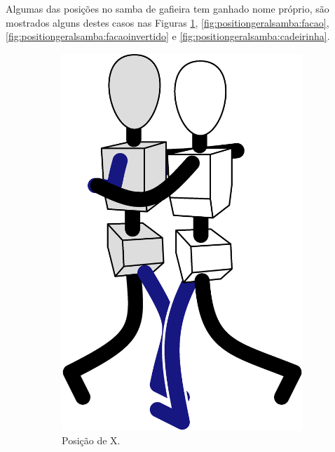 Algumas das posições no samba de gafieira tem ganhado nome próprio, 
são mostrados alguns destes casos nas
Figuras \ref{fig:positiongeralsamba:x}, \ref{fig:positiongeralsamba:facao}, 
\ref{fig:positiongeralsamba:facaoinvertido} e \ref{fig:positiongeralsamba:cadeirinha}.
\begin{figure}[!ht]
     \centering
     \begin{subfigure}[b]{0.235\textwidth}
         \centering
         \includegraphics[width=\textwidth]{chapters/cap-normas/position-x.eps}
         \caption{Posição de X.}
         \label{fig:positiongeralsamba:x}
     \end{subfigure}
     \hfill
     \begin{subfigure}[b]{0.205\textwidth}

\end{subfigure}
\end{figure}
